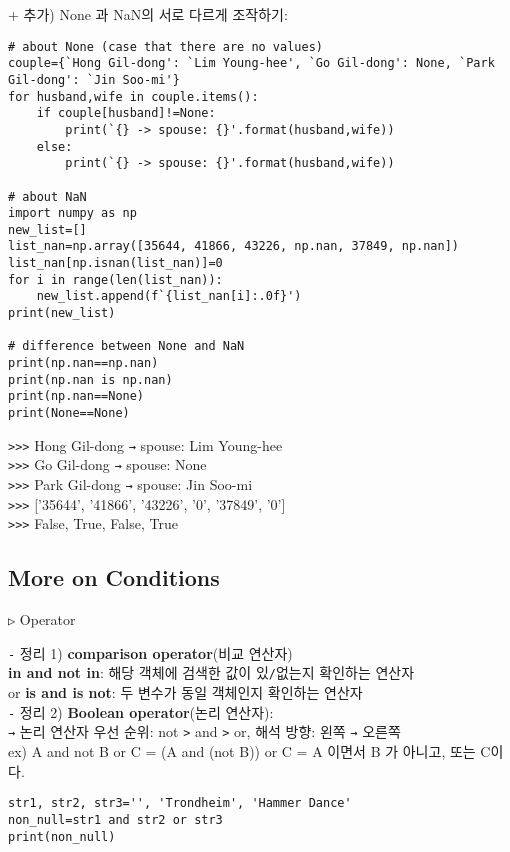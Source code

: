 \documentclass[11pt,a4paper]{article}
\begin{document}
+ 추가) None 과 NaN의 서로 다르게 조작하기:\\
\begin{lstlisting}[label={list:first},caption=example of None]
# about None (case that there are no values)
couple={`Hong Gil-dong': `Lim Young-hee', `Go Gil-dong': None, `Park Gil-dong': `Jin Soo-mi'}
for husband,wife in couple.items():
    if couple[husband]!=None:
        print(`{} -> spouse: {}'.format(husband,wife))
    else:
        print(`{} -> spouse: {}'.format(husband,wife))

# about NaN
import numpy as np
new_list=[]
list_nan=np.array([35644, 41866, 43226, np.nan, 37849, np.nan])
list_nan[np.isnan(list_nan)]=0
for i in range(len(list_nan)):
    new_list.append(f`{list_nan[i]:.0f}')
print(new_list)

# difference between None and NaN
print(np.nan==np.nan)
print(np.nan is np.nan)
print(np.nan==None)
print(None==None)
\end{lstlisting}
\verb|>>>| Hong Gil-dong \texttt{→} spouse: Lim Young-hee\\
\verb|>>>| Go Gil-dong \texttt{→} spouse: None\\
\verb|>>>| Park Gil-dong \texttt{→} spouse: Jin Soo-mi\\

\verb|>>>| ['35644', '41866', '43226', '0', '37849', '0']\\

\verb|>>>| False, True, False, True\\


\subsection{\Large\textbf{More on Conditions}}
\texttt{▷} Operator\\
\begin{spacing}{1.5}
\texttt{-} 정리 1) \textbf{comparison operator}(비교 연산자)\\
\hspace*{4em} \textbf{in and not in}: 해당 객체에 검색한 값이 있\texttt{/}없는지 확인하는 연산자\\
\hspace*{4em} or \textbf{is and is not}: 두 변수가 동일 객체인지 확인하는 연산자\\

\texttt{-} 정리 2) \textbf{Boolean operator}(논리 연산자):\\
\hspace*{2em}\texttt{→} 논리 연산자 우선 순위: not \texttt{>} and \texttt{>} or, 해석 방향: 왼쪽 \texttt{→} 오른쪽\\
\hspace*{2em} ex) A and not B or C = (A and (not B)) or C = A 이면서 B 가 아니고, 또는 C이다.
\end{spacing}
\begin{lstlisting}[label={list:first}, 논리 연산자 우선 순위]
str1, str2, str3='', 'Trondheim', 'Hammer Dance'
non_null=str1 and str2 or str3
print(non_null)
\end{lstlisting}
\end{document}
